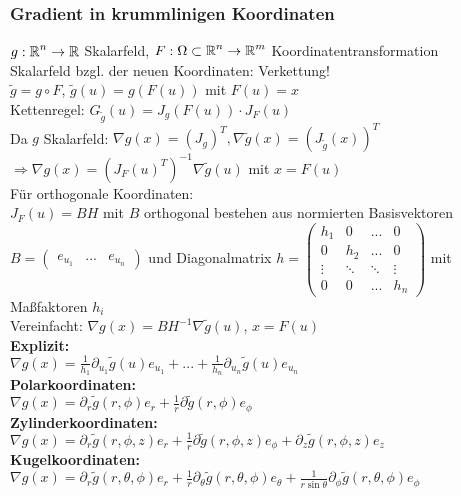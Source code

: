 \documentclass[german]{latex4ei/latex4ei_sheet}
\begin{document}
\subsubsection{Gradient in krummlinigen Koordinaten}
$g: \operatorname{\mathbb R}^n \to \operatorname{\mathbb R}$ Skalarfeld, $F: \Omega \subset \operatorname{\mathbb R}^n \to \operatorname{\mathbb R}^m$ Koordinatentransformation\\
Skalarfeld bzgl. der neuen Koordinaten: Verkettung!\\
$\tilde{g}=g \circ F$, $\tilde{g}(u)=g(F(u))$ mit $F(u)=x$\\
Kettenregel: $G_{\tilde{g}}(u)=J_{g}(F(u)) \cdot J_F(u)$\\
Da $g$ Skalarfeld: $\nabla g(x)=(J_g)^T, \nabla \tilde{g}(x)=(J_{\tilde{g}}(x))^T$\\
$\Rightarrow \nabla g(x)=(J_F(u)^T)^{-1}\nabla \tilde{g}(u)$ mit $x=F(u)$\\
F\"ur orthogonale Koordinaten:\\
$J_F(u)=B H$ mit $B$ orthogonal bestehen aus normierten Basisvektoren $B=\begin{pmatrix}
e_{u_1} & ... & e_{u_n}
\end{pmatrix}$ und Diagonalmatrix $h=\begin{pmatrix}
h_1 & 0 & ... & 0 \\
0 & h_2 & ... & 0 \\
\vdots & \ddots & \ddots & \vdots \\
0 & 0 & ... & h_n 
\end{pmatrix} $ mit Ma\ss{}faktoren $h_i$\\
Vereinfacht: $\nabla g(x)=B H^{-1}\nabla \tilde{g}(u)$, $x=F(u)$\\
\textbf{Explizit:}\\
$\nabla g(x)=\frac{1}{h_1}\partial_{u_1} \tilde{g}(u) e_{u_1}+...+\frac{1}{h_n}\partial_{u_n} \tilde{g}(u) e_{u_n}$\\
\textbf{Polarkoordinaten:}\\
$\nabla g(x)=\partial_r \tilde{g}(r,\phi)e_r+\frac{1}{r} \partial \tilde{g}(r,\phi) e_\phi$\\
\textbf{Zylinderkoordinaten:}\\
$\nabla g(x)=\partial_r \tilde{g}(r,\phi,z)e_r+\frac{1}{r} \partial \tilde{g}(r,\phi,z) e_\phi+\partial_z \tilde{g}(r,\phi,z)e_z$\\
\textbf{Kugelkoordinaten:}\\
$\nabla g(x)=\partial_r \tilde{g}(r,\theta,\phi) e_r + \frac{1}{r} \partial_\theta \tilde{g}(r,\theta,\phi)e_\theta+\frac{1}{r \sin \theta} \partial_\phi \tilde{g}(r,\theta,\phi) e_\phi$\\
\end{document}
